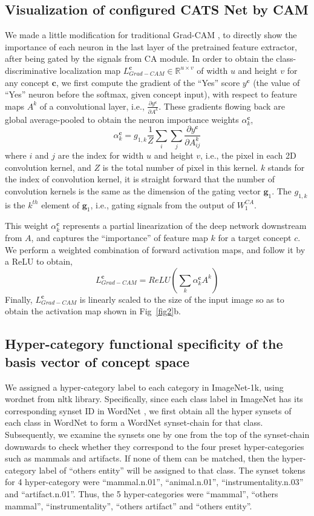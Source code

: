 \documentclass[pdflatex,sn-mathphys-num,lineno]{sn-jnl}%
\begin{document}
\begin{CJK}{UTF8}{gbsn}
\subsection{Visualization of configured CATS Net by CAM}
We made a little modification for traditional Grad-CAM \cite{selvaraju_grad-cam_2017}, to directly show the importance of each neuron in the last layer of the pretrained feature extractor, after being gated by the signals from CA module. In order to obtain the class-discriminative localization map $L_{Grad-CAM}^{\mathbf{c}} \in \mathbb{R}^{u \times v}$ of width $u$ and height $v$ for any concept $\mathbf{c}$, we first compute the gradient of the “Yes” score $y^\mathbf{c}$ (the value of “Yes” neuron before the softmax, given concept input), with respect to feature maps $A^k$ of a convolutional layer, i.e., $\frac{\partial y^\mathbf{c}}{\partial A^k}$. These gradients flowing back are global average-pooled to obtain the neuron importance weights $\alpha_k^\mathbf{c}$,
\[
\alpha_k^\mathbf{c} = g_{1, k} \frac{1}{Z} \sum_i \sum_j \frac{\partial y^\mathbf{c}}{\partial A^k_{ij}}
\]
where $i$ and $j$ are the index for width $u$ and height $v$, i.e., the pixel in each 2D convolution kernel, and $Z$ is the total number of pixel in this kernel. $k$ stands for the index of convolution kernel, it is straight forward that the number of convolution kernels is the same as the dimension of the gating vector $\mathbf{g}_1$. The $g_{1, k}$ is the $k^{th}$ element of $\mathbf{g}_1$, i.e., gating signals from the output of $W_1^{CA}$. 

This weight $\alpha_k^\mathbf{c}$ represents a partial linearization of the deep network downstream from $A$, and captures the “importance” of feature map $k$ for a target concept $c$. We perform a weighted combination of forward activation maps, and follow it by a ReLU to obtain,
\[
L_{Grad-CAM}^{\mathbf{c}} = ReLU(\sum_k \alpha_k^\mathbf{c} A^k)
\] 
Finally, $L_{Grad-CAM}^{\mathbf{c}}$ is linearly scaled to the size of the input image so as to obtain the activation map shown in Fig~\ref{fig2}b.

\subsection{Hyper-category functional specificity of the basis vector of concept space}
We assigned a hyper-category label to each category in ImageNet-1k, using wordnet from nltk library. Specifically, since each class label in ImageNet has its corresponding synset ID in WordNet \cite{fellbaum_wordnet_1998}, we first obtain all the hyper synsets of each class in WordNet to form a WordNet synset-chain for that class. Subsequently, we examine the synsets one by one from the top of the synset-chain downwards to check whether they correspond to the four preset hyper-categories such as mammals and artifacts. If none of them can be matched, then the hyper-category label of “others entity” will be assigned to that class. The synset tokens for 4 hyper-category were “mammal.n.01”, “animal.n.01”, “instrumentality.n.03” and “artifact.n.01”. Thus, the 5 hyper-categories were “mammal”, “others mammal”, “instrumentality”, “others artifact” and “others entity”.


\end{CJK}
\end{document}
